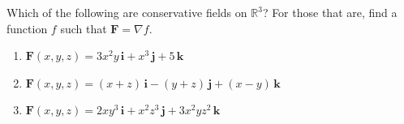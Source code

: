 \documentclass[openany]{book}
\begin{document}
\begin{prob}[20]
    Which of the following are conservative fields on \( \mathbb{R}^3 \)?  
    For those that are, find a function \( f \) such that \( \mathbf{F} = \nabla f \).  

    \begin{enumerate}
        \item[(a)] \( \mathbf{F}(x, y, z) = 3x^2 y \, \mathbf{i} + x^3 \, \mathbf{j} + 5 \, \mathbf{k} \)
        \item[(b)] \( \mathbf{F}(x, y, z) = (x + z) \, \mathbf{i} - (y + z) \, \mathbf{j} + (x - y) \, \mathbf{k} \)
        \item[(c)] \( \mathbf{F}(x, y, z) = 2xy^3 \, \mathbf{i} + x^2 z^3 \, \mathbf{j} + 3x^2 y z^2 \, \mathbf{k} \)
    \end{enumerate}
\end{prob}
\end{document}
